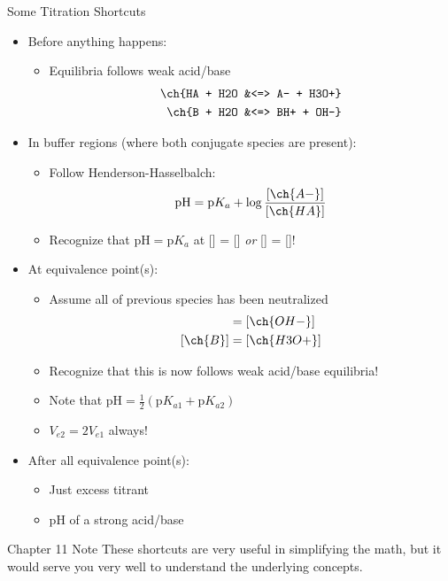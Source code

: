 \documentclass[notes=hide]{beamer}
\begin{document}
\begin{frame}[allowframebreaks]{Some Titration Shortcuts}
	\begin{itemize}
		\item Before anything happens:
			\begin{itemize}
				\item Equilibria follows weak acid/base
					\begin{align*}
						\ch{HA + H2O &<=> A- + H3O+} \\
						\ch{B + H2O &<=> BH+ + OH-}
					\end{align*}
			\end{itemize}
		\item In buffer regions (where both conjugate species are
			present):
			\begin{itemize}
				\item Follow Henderson-Hasselbalch:
					\begin{align*}
						\text{pH} = \text{p}K_a +
						\log\dfrac{[\ch{A-}]}{[\ch{HA}]}
					\end{align*}
				\item Recognize that $\text{pH} = \text{p}K_a$
					at [] = [] \textit{or}
					[] = []!
			\end{itemize}

			\framebreak

		\item At equivalence point(s):
			\begin{itemize}
				\item Assume all of previous species has been
					neutralized
					\begin{align*}
						[\ch{HA}] &= [\ch{OH-}] \\
						[\ch{B}] &= [\ch{H3O+}]
					\end{align*}
				\item Recognize that this is now follows
					\alert{weak acid/base equilibria}!
				\item Note that $\text{pH} =
					\frac{1}{2}(\text{p}K_{a1} +
					\text{p}K_{a2})$
				\item $V_{e2} = 2V_{e1}$ \alert{always}!
			\end{itemize}
		\item After all equivalence point(s):
			\begin{itemize}
				\item Just excess titrant
				\item pH of a strong acid/base
			\end{itemize}
	\end{itemize}

	\begin{block}{Chapter 11 Note}
		These shortcuts are very useful in simplifying the math, but it
		would serve you very well to understand the underlying concepts.
	\end{block}
\end{frame}
\end{document}
